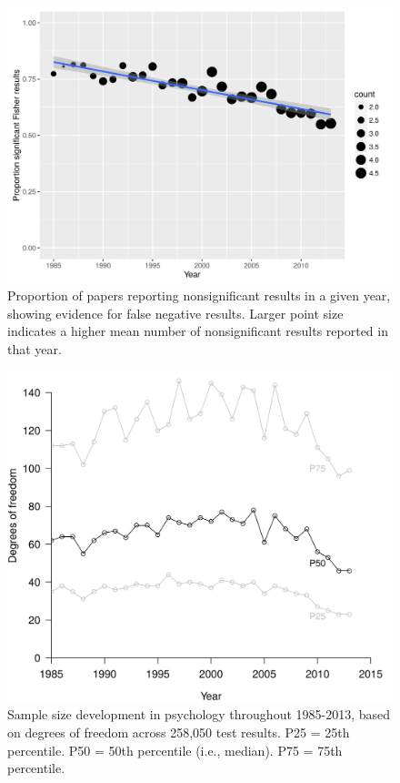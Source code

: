 \documentclass[a5paper]{book}
\begin{document}
\begin{figure}[h]

{\centering \includegraphics[width=1\linewidth]{assets/figures/tgtbf-fig4.pdf.svg} 

}

\caption{Proportion of papers reporting nonsignificant results in a given year, showing evidence for false negative results. Larger point size indicates a higher mean number of nonsignificant results reported in that year.}\label{fig:tgtbf-fig4}
\end{figure}

\begin{figure}[h]

{\centering \includegraphics[width=1\linewidth]{assets/figures/tgtbf-fig5.pdf.svg} 

}

\caption{Sample size development in psychology throughout 1985-2013, based on degrees of freedom across 258,050 test results. P25 = 25th percentile. P50 = 50th percentile (i.e., median). P75 = 75th percentile.}\label{fig:tgtbf-fig5}
\end{figure}
\end{document}
